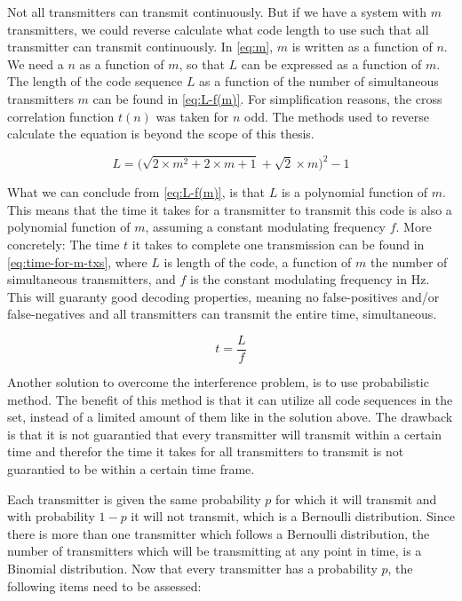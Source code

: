 Not all transmitters can transmit continuously.
But if we have a system with $m$ transmitters, we could reverse calculate what code length to use such that all transmitter can transmit continuously.
In \autoref{eq:m}, $m$ is written as a function of $n$.
We need a $n$ as a function of $m$, so that $L$ can be expressed as a function of $m$.
The length of the code sequence $L$ as a function of the number of simultaneous transmitters $m$ can be found in \autoref{eq:L-f(m)}.
For simplification reasons, the cross correlation function $t(n)$ was taken for $n$ odd. 
The methods used to reverse calculate the equation is beyond the scope of this thesis.


\begin{equation}
	\label{eq:L-f(m)}
	L = \Bigg(\sqrt{2 \times m^2 + 2 \times m + 1} + \sqrt{2} \times m \Bigg)^2 - 1
\end{equation} 


What we can conclude from \autoref{eq:L-f(m)}, is that $L$ is a polynomial function of $m$.
This means that the time it takes for a transmitter to transmit this code is also a polynomial function of $m$, assuming a constant modulating frequency $f$. 
More concretely: The time $t$ it takes to complete one transmission can be found in \autoref{eq:time-for-m-txs}, where $L$ is length of the code, a function of $m$ the number of simultaneous transmitters, and $f$ is the constant modulating frequency in Hz.
This will guaranty good decoding properties, meaning no false-positives and/or false-negatives and all transmitters can transmit the entire time, simultaneous.

\begin{equation}
	\label{eq:time-for-m-txs}
	t = \frac{L}{f}
\end{equation}


Another solution to overcome the interference problem, is to use probabilistic method.
The benefit of this method is that it can utilize all code sequences in the set, instead of a limited amount of them like in the solution above.
The drawback is that it is not guarantied that every transmitter will transmit within a certain time and therefor the time it takes for all transmitters to transmit is not guarantied to be within a certain time frame.


Each transmitter is given the same probability $p$ for which it will transmit and with probability $1 - p$ it will not transmit, which is a Bernoulli distribution.
Since there is more than one transmitter which follows a Bernoulli distribution, the number of transmitters which will be transmitting at any point in time, is a Binomial distribution.
Now that every transmitter has a probability $p$, the following items need to be assessed:

